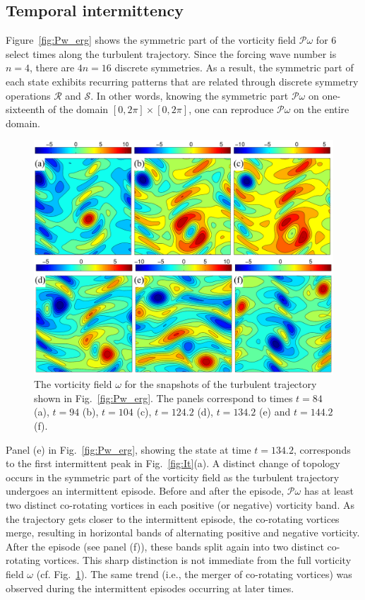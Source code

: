 \documentclass{jfm}
\begin{document}
\subsection{Temporal intermittency}
Figure~\ref{fig:Pw_erg} shows the symmetric part of the vorticity field $\mathcal P\omega$
for 6 select times along the turbulent trajectory. Since the forcing wave number is
$n=4$, there are $4n=16$ discrete symmetries. As a result, the symmetric part of each state
exhibits recurring patterns that are related through discrete symmetry operations $\mathcal R$
and $\mathcal S$. In other words, knowing the symmetric part $\mathcal P\omega$ on one-sixteenth of
the domain $[0,2\pi]\times[0,2\pi]$, one can reproduce $\mathcal P\omega$ on the entire domain.
%
\begin{figure}
\centering
\includegraphics[width=\textwidth]{R40_w}
\caption{The vorticity field $\omega$ for the snapshots of the turbulent trajectory 
shown in Fig.~\ref{fig:Pw_erg}. The panels correspond to times
$t=84$ (a),
$t=94$ (b),
$t=104$ (c),
$t=124.2$ (d),
$t=134.2$ (e) and
$t=144.2$ (f).
}
\label{fig:w_erg}
\end{figure}

Panel (e) in Fig.~\ref{fig:Pw_erg}, showing the state at time $t=134.2$,
corresponds to the first intermittent peak in Fig.~\ref{fig:It}(a). A
distinct change of topology occurs in the symmetric part of
the vorticity field as the turbulent trajectory undergoes an intermittent episode.
Before and after the episode, $\mathcal P\omega$ has at least two
distinct co-rotating vortices in each positive (or negative) vorticity band. As the trajectory
gets closer to the intermittent episode, the co-rotating vortices merge, resulting
in horizontal bands of alternating positive and negative vorticity. After the episode
(see panel (f)), these bands split again into two distinct co-rotating vortices.
This sharp distinction is not immediate from the full vorticity field $\omega$
(cf. Fig.~\ref{fig:w_erg}).
The same trend (i.e., the merger of co-rotating vortices) was observed during
the intermittent episodes occurring at later times.
\end{document}
